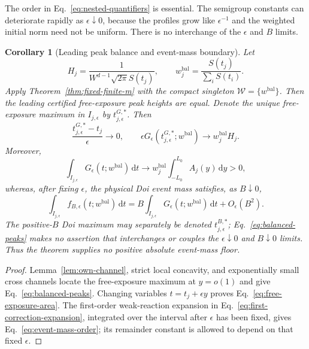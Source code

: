 \documentclass[aps,physrev,onecolumn,amsmath,amssymb,longbibliography]{revtex4-2}
\newcommand{\dd}{\mathrm d}
\newcommand{\Wset}{\mathcal W}
\newtheorem{corollary}[theorem]{Corollary}
\begin{document}
The order in Eq.~\eqref{eq:nested-quantifiers} is essential.  The semigroup
constants can deteriorate rapidly as \(\epsilon\downarrow0\), because the
profiles grow like \(\epsilon^{-1}\) and the weighted initial norm need not be
uniform.  There is no interchange of the \(\epsilon\) and \(B\) limits.

\begin{corollary}[Leading peak balance and event-mass boundary]
\label{cor:peak-balance}
Let
\begin{equation}
 H_j=\frac{1}{W^{d-1}\sqrt{2\pi}S(t_j)},
 \qquad
 w_j^{\mathrm{bal}}=\frac{S(t_j)}{\sum_iS(t_i)}.
 \label{eq:peak-balancing-weights}
\end{equation}
Apply Theorem~\ref{thm:fixed-finite-m} with the compact singleton
\(\Wset=\{w^{\mathrm{bal}}\}\).  Then the leading certified free-exposure peak
heights are equal.  Denote the unique free-exposure maximum in
\(I_{j,\epsilon}\) by \(t^{G,*}_{j,\epsilon}\).  Then
\begin{equation}
 \frac{t^{G,*}_{j,\epsilon}-t_j}{\epsilon}\to0,
 \qquad
 \epsilon G_\epsilon(t^{G,*}_{j,\epsilon};w^{\mathrm{bal}})
 \to w_j^{\mathrm{bal}}H_j.
 \label{eq:balanced-peaks}
\end{equation}
Moreover,
\begin{equation}
 \int_{I_{j,\epsilon}}G_\epsilon(t;w^{\mathrm{bal}})\,\dd t
 \longrightarrow w_j^{\mathrm{bal}}
 \int_{-L_0}^{L_0}A_j(y)\,\dd y>0,
 \label{eq:free-exposure-area}
\end{equation}
whereas, after fixing \(\epsilon\), the physical Doi event mass satisfies, as
\(B\downarrow0\),
\begin{equation}
 \int_{I_{j,\epsilon}}f_{B,\epsilon}
 (t;w^{\mathrm{bal}})\,\dd t
 =B\int_{I_{j,\epsilon}}G_\epsilon
 (t;w^{\mathrm{bal}})\,\dd t+O_\epsilon(B^2).
 \label{eq:event-mass-order}
\end{equation}
The positive-\(B\) Doi maximum may separately be denoted
\(t^{B,*}_{j,\epsilon}\); Eq.~\eqref{eq:balanced-peaks} makes no assertion that
interchanges or couples the \(\epsilon\downarrow0\) and \(B\downarrow0\)
limits.  Thus the theorem supplies no positive absolute event-mass floor.
\end{corollary}

\begin{proof}
Lemma~\ref{lem:own-channel}, strict local concavity, and exponentially small
cross channels locate the free-exposure maximum at \(y=o(1)\) and give
Eq.~\eqref{eq:balanced-peaks}.  Changing variables
\(t=t_j+\epsilon y\) proves Eq.~\eqref{eq:free-exposure-area}.
The first-order weak-reaction expansion in
Eq.~\eqref{eq:first-correction-expansion}, integrated over the interval after
\(\epsilon\) has been fixed, gives Eq.~\eqref{eq:event-mass-order}; its
remainder constant is allowed to depend on that fixed \(\epsilon\).
\end{proof}
\end{document}

